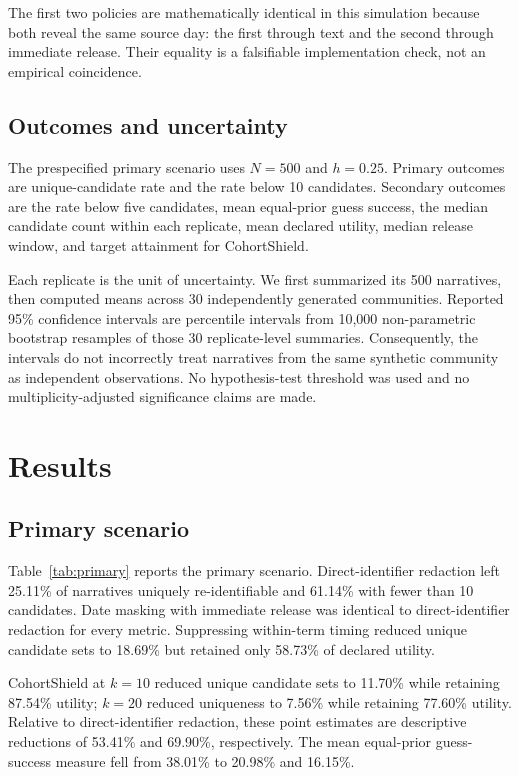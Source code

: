 \documentclass[pdflatex,sn-mathphys-num]{sn-jnl}
\theoremstyle{plain}
\begin{document}
The first two policies are mathematically identical in this simulation because both reveal the same source day: the first through text and the second through immediate release. Their equality is a falsifiable implementation check, not an empirical coincidence.

\subsection{Outcomes and uncertainty}

The prespecified primary scenario uses $N=500$ and $h=0.25$. Primary outcomes are unique-candidate rate and the rate below 10 candidates. Secondary outcomes are the rate below five candidates, mean equal-prior guess success, the median candidate count within each replicate, mean declared utility, median release window, and target attainment for CohortShield.

Each replicate is the unit of uncertainty. We first summarized its 500 narratives, then computed means across 30 independently generated communities. Reported 95\% confidence intervals are percentile intervals from 10,000 non-parametric bootstrap resamples of those 30 replicate-level summaries. Consequently, the intervals do not incorrectly treat narratives from the same synthetic community as independent observations. No hypothesis-test threshold was used and no multiplicity-adjusted significance claims are made.

\section{Results}\label{sec:results}

\subsection{Primary scenario}

Table~\ref{tab:primary} reports the primary scenario. Direct-identifier redaction left 25.11\% of narratives uniquely re-identifiable and 61.14\% with fewer than 10 candidates. Date masking with immediate release was identical to direct-identifier redaction for every metric. Suppressing within-term timing reduced unique candidate sets to 18.69\% but retained only 58.73\% of declared utility.

CohortShield at $k=10$ reduced unique candidate sets to 11.70\% while retaining 87.54\% utility; $k=20$ reduced uniqueness to 7.56\% while retaining 77.60\% utility. Relative to direct-identifier redaction, these point estimates are descriptive reductions of 53.41\% and 69.90\%, respectively. The mean equal-prior guess-success measure fell from 38.01\% to 20.98\% and 16.15\%.
\end{document}
